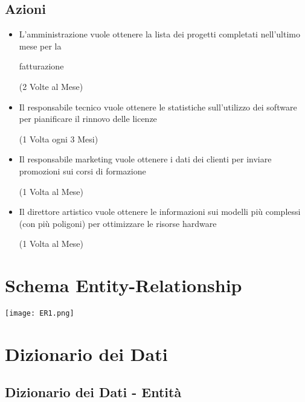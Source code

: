 \documentclass[a4paper,11pt]{article}
\begin{document}
{\subsection*{Azioni}
\begin{itemize}
  \item L'amministrazione vuole ottenere la lista dei progetti completati nell'ultimo mese per la 
  
  fatturazione 
  \begin{flushright}
(2 Volte al Mese)
  \end{flushright}
  \item Il responsabile tecnico vuole ottenere le statistiche sull'utilizzo dei software per pianificare il rinnovo delle licenze 
  \begin{flushright}
  (1 Volta ogni 3 Mesi)
  \end{flushright}
  \item Il responsabile marketing vuole ottenere i dati dei clienti per inviare promozioni sui corsi di formazione 
  \begin{flushright}
  (1 Volta al Mese)
  \end{flushright}
  \item Il direttore artistico vuole ottenere le informazioni sui modelli più complessi (con più poligoni) per ottimizzare le risorse hardware 
  \begin{flushright}
  (1 Volta al Mese)
  \end{flushright}
\end{itemize}
\newpage


\section{Schema Entity-Relationship}
\texttt{[image: ER1.png]}
\newpage


\section{Dizionario dei Dati}

\subsection{Dizionario dei Dati - Entità}

}
\end{document}
